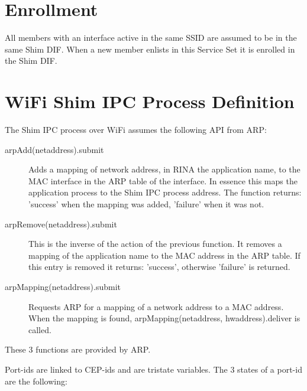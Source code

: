 \section{Enrollment}

All members with an interface active in the same SSID are assumed to be in the same Shim DIF. When a new member enlists in this Service Set it is enrolled in the Shim DIF. 

\section{WiFi Shim IPC Process Definition}
\label{sec:wifi_shim_ipc_proc_def}

The Shim IPC process over WiFi assumes the following API from ARP:

\begin{description}
	\item[arpAdd(netaddress).submit] Adds a mapping of network address, in RINA the application name, to the MAC interface in the ARP table of the interface. In essence this maps the application process to the Shim IPC process address. The function returns: 'success' when the mapping was added, 'failure' when it was not. 
	\item[arpRemove(netaddress).submit] This is the inverse of the action of the previous function. It removes a mapping of the application name to the MAC address in the ARP table. If this entry is removed it returns: 'success', otherwise 'failure' is returned.
	\item[arpMapping(netaddress).submit] Requests ARP for a mapping of a network address to a MAC address. When the mapping is found, arpMapping(netaddress, hwaddress).deliver is called.
\end{description}

These 3 functions are provided by ARP.

	 

\npar

Port-ids are linked to CEP-ids and are tristate variables. The 3 states of a port-id are the following:

